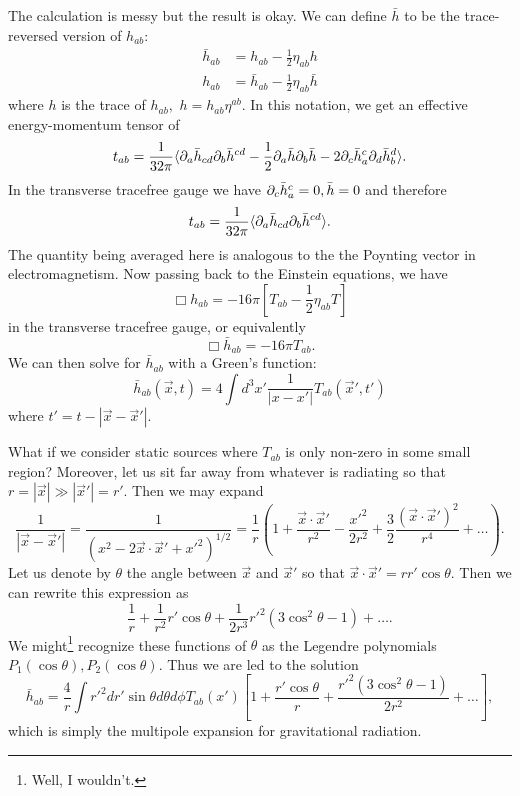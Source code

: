 The calculation is messy but the result is okay. We can define $\bar h$ to be the trace-reversed version of $h_{ab}$:
\begin{align*}
    \bar h_{ab}&=h_{ab}-\frac{1}{2}\eta_{ab} h\\
    h_{ab}&=\bar h_{ab}-\frac{1}{2}\eta_{ab}\bar h
\end{align*}
where $h$ is the trace of $h_{ab},$ $h=h_{ab}\eta^{ab}$. In this notation, we get an effective energy-momentum tensor of
$$t_{ab}=\frac{1}{32\pi}\langle\partial_a \bar h_{cd}\partial_b \bar h^{cd}-\frac{1}{2}\partial_a \bar h \partial_b \bar h-2\partial_c \bar h_a^c \partial_d \bar h_b^d\rangle.$$
In the transverse tracefree gauge we have $\partial_c \bar h^c_a=0,\bar h=0$ and therefore
$$t_{ab}=\frac{1}{32\pi}\langle\partial_a \bar h_{cd} \partial_b \bar h^{cd}\rangle.$$
The quantity being averaged here is analogous to the the Poynting vector in electromagnetism. Now passing back to the Einstein equations, we have
$$\Box h_{ab}=-16\pi[T_{ab}-\frac{1}{2}\eta_{ab}T]$$
in the transverse tracefree gauge, or equivalently
$$\Box \bar h_{ab}=-16\pi T_{ab}.$$
We can then solve  for $\bar h_{ab}$ with a Green's function:
$$\bar h_{ab}(\vec x,t)=4\int d^3 x'\frac{1}{| x-x'|}T_{ab}(\vec x',t')$$
where $t'=t-|\vec x-\vec x'|$.

What if we consider static sources where $T_{ab}$ is only non-zero in some small region? Moreover, let us sit far away from whatever is radiating so that $r=|\vec x|\gg |\vec x'|=r'$. Then we may expand
$$\frac{1}{|\vec x-\vec x'|}=\frac{1}{(x^2-2\vec x \cdot \vec x' + {x'}^2)^{1/2}}=\frac{1}{r}\left(1+\frac{\vec x \cdot \vec x'}{r^2}-\frac{{x'}^2}{2r^2}+\frac{3}{2}\frac{(\vec x \cdot \vec x')^2}{r^4}+\ldots\right).$$
Let us denote by $\theta$ the angle between $\vec x$ and $\vec x'$ so that $\vec x \cdot \vec x'=r r' \cos\theta$. Then we can rewrite this expression as
$$\frac{1}{r}+\frac{1}{r^2}r' \cos\theta +\frac{1}{2r^3} r'^2(3\cos^2\theta-1)+\ldots.$$
We might\footnote{Well, I wouldn't.} recognize these functions of $\theta$ as the Legendre polynomials $P_1(\cos\theta),P_2(\cos\theta)$. Thus we are led to the solution
$$\bar h_{ab}=\frac{4}{r}\int {r'}^2 dr' \sin\theta d\theta d\phi T_{ab}(x')\left[1+\frac{r'\cos\theta}{r}+\frac{{r'}^2 (3\cos^2\theta-1)}{2r^2}+\ldots\right],$$
which is simply the multipole expansion for gravitational radiation.